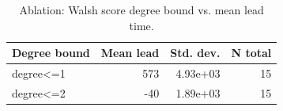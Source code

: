 \begin{table}
\caption{Ablation: Walsh score degree bound vs. mean lead time.}
\label{tab:ablation_degree}
\begin{tabular}{lrrr}
\toprule
Degree bound & Mean lead & Std. dev. & N total \\
\midrule
degree<=1 & 573 & 4.93e+03 & 15 \\
degree<=2 & -40 & 1.89e+03 & 15 \\
\bottomrule
\end{tabular}
\end{table}
